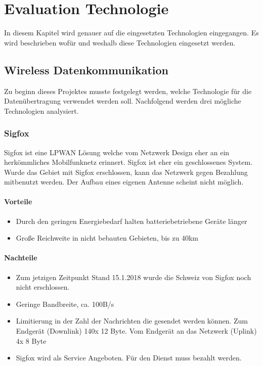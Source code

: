 \documentclass[11pt,english,german]{report}
\theoremstyle{definition}
\begin{document}
\chapter{Evaluation Technologie}
In diesem Kapitel wird genauer auf die eingesetzten Technologien eingegangen. Es wird beschrieben wofür und weshalb diese Technologien eingesetzt werden. 

\section{Wireless Datenkommunikation}
Zu beginn dieses Projektes musste festgelegt werden, welche Technologie für die Datenübertragung verwendet werden soll. Nachfolgend werden drei mögliche Technologien analysiert.

\subsection{Sigfox}
Sigfox ist eine LPWAN Lösung welche vom Netzwerk Design eher an ein herkömmliches Mobilfunknetz erinnert. Sigfox ist eher ein geschlossenes System. Wurde das Gebiet mit Sigfox erschlossen, kann das Netzwerk gegen Bezahlung mitbenutzt werden. Der Aufbau eines eigenen Antenne scheint nicht möglich. 

\subsubsection{Vorteile}
\begin{itemize}
	\item Durch den geringen Energiebedarf halten batteriebetriebene Geräte länger
	\item Große Reichweite in nicht bebauten Gebieten, bis zu 40km
\end{itemize}
\subsubsection{Nachteile}
\begin{itemize}
	\item Zum jetzigen Zeitpunkt Stand 15.1.2018 wurde die Schweiz von Sigfox noch nicht erschlossen.
	\item Geringe Bandbreite, ca. 100B/s
	\item Limitierung in der Zahl der Nachrichten die gesendet werden können. Zum Endgerät (Downlink) 140x 12 Byte. Vom Endgerät an das Netzwerk (Uplink) 4x 8 Byte
	\item Sigfox wird als Service Angeboten. Für den Dienst muss bezahlt werden.
\end{itemize}
\end{document}
